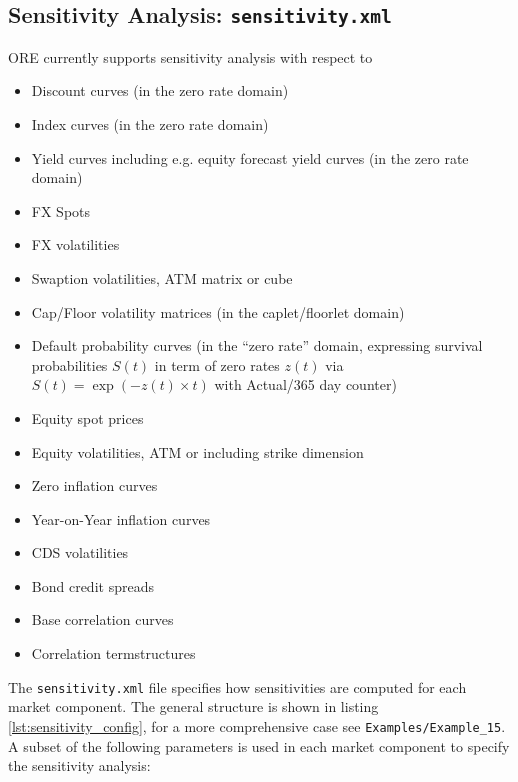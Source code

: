 \subsection{Sensitivity Analysis: {\tt sensitivity.xml}}\label{sec:sensitivity}

ORE currently supports sensitivity analysis with respect to
\begin{itemize}
\item Discount curves  (in the zero rate domain)
\item Index curves (in the zero rate domain)
\item Yield curves including e.g. equity forecast yield curves (in the zero rate domain)
\item FX Spots
\item FX volatilities
\item Swaption volatilities, ATM matrix or cube 
\item Cap/Floor volatility matrices (in the caplet/floorlet domain)
\item Default probability curves (in the ``zero rate'' domain, expressing survival probabilities $S(t)$ in term of zero rates $z(t)$ via $S(t)=\exp(-z(t)\times t)$ with Actual/365 day counter)
\item Equity spot prices
\item Equity volatilities, ATM or including strike dimension 
\item Zero inflation curves
\item Year-on-Year inflation curves
\item CDS volatilities
\item Bond credit spreads
\item Base correlation curves
\item Correlation termstructures
\end{itemize}

The {\tt sensitivity.xml} file specifies how sensitivities are computed for each market component. 
The general structure is shown in listing \ref{lst:sensitivity_config}, for a more comprehensive case see {\tt Examples/Example\_15}. A subset of the following parameters is used in each market component to specify the sensitivity analysis:

